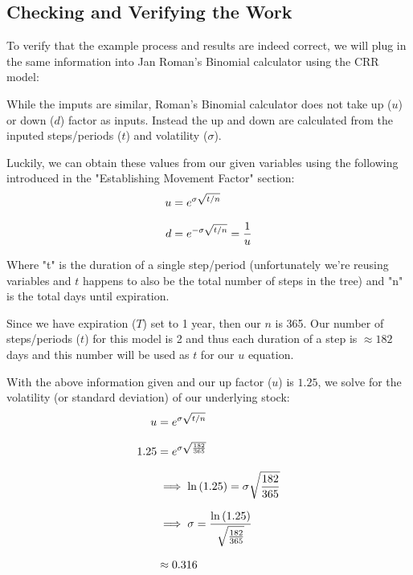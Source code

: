 \documentclass[12pt, letterpaper]{article}
\begin{document}
\subsection*{Checking and Verifying the Work}
To verify that the example process and results are indeed correct, we will plug in the same information into Jan Roman's Binomial calculator using the CRR model: %

While the imputs are similar, Roman's Binomial calculator does not take up (${u}$) or down (${d}$) factor as inputs.
Instead the up and down are calculated from the inputed steps/periods (${t}$) and volatility (${\sigma}$).

Luckily, we can obtain these values from our given variables using the following introduced in the "Establishing Movement Factor" section:
\begin{equation*}
  \setlength{\jot}{10pt}
  \begin{split}
    u
    & = e^{\sigma\sqrt{t/n}}
    \\
    d
    & = e^{-\sigma\sqrt{t/n}} = \frac{1}{u}
  \end{split}
\end{equation*}

Where "t" is the duration of a single step/period (unfortunately we're reusing variables and ${t}$ happens to also be the total number of steps in the tree)
and "n" is the total days until expiration.

Since we have expiration (${T}$) set to 1 year, then our ${n}$ is 365.
Our number of steps/periods (${t}$) for this model is 2 and thus each duration of a step is ${\approx 182}$ days and this number will be used as ${t}$ for our ${u}$ equation.

With the above information given and our up factor (${u}$) is ${1.25}$, we solve for the volatility (or standard deviation) of our underlying stock:
\begin{equation*}
  \setlength{\jot}{10pt}
  \begin{split}
    u
    & = e^{\sigma\sqrt{t/n}}
    \\
    1.25
    & = e^{\sigma\sqrt{\frac{182}{365}}}
    \\
    & \implies \ln{(1.25)} = \sigma\sqrt{\frac{182}{365}}
    \\
    & \implies \sigma = \frac{\ln{(1.25)}}{\sqrt{\frac{182}{365}}}
    \\
    & \approx 0.316
  \end{split}
\end{equation*}
\end{document}
